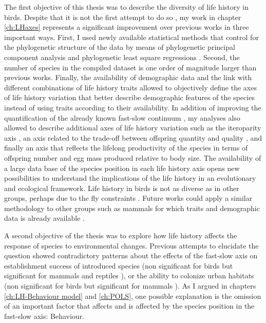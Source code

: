The first objective of this thesis was to describe the diversity of life
history in birds. Despite that it is not the first attempt to do so
\citep{Saether1987,Gaillard1989,Saether2000,Jeschke2009}, my work in chapter
\ref{ch:LHaxes} represents a significant improvement over previous works in
three important ways.
First, I used newly available statistical methods that control for the
phylogenetic structure of the data by means of phylogenetic principal component
analysis \citep{Revell2009a} and phylogenetic least square regressions
\citep{Ho2014}.
Second, the number of species in the compiled dataset is one order of magnitude
larger than previous works. Finally, the availability of demographic data and
the link with different combinations of life history traits allowed to
objectively define the axes of life history variation that better describe
demographic features of the species instead of using traits according to their
availability.
In addition of improving the quantification of the already known fast-slow
continuum
\citep{Stearns1983a,Saether1987,Gaillard1989,Oli2004,Dobson2007,Jeschke2009},
my analyses also allowed to describe additional axes of life history variation
such as the iteroparity axis \citep{Gaillard1989}, an axis related to the
trade-off between offspring quantity and quality
\citep{Promislow1990,Bielby2007,Dobson2007}, and finally an axis that reflects
the lifelong productivity of the species in terms of offspring number and egg
mass produced relative to body size.
The availability of a large data base of the species position in each life
history axis opens new possibilities to understand the implications of the life
history in an evolutionary and ecological framework.
Life history in birds is not as diverse as in other groups, perhaps due to the
fly constraints \citep{Gaillard1989,Healy2014}.
Future works could apply a similar methodology to other groups such as mammals
for which traits and demographic data is already available
\citep{Myhrvold2015,Salguero-Gomez2016}.

\bigskip

A second objective of the thesis was to explore how life history affects the
response of species to environmental changes. Previous attempts to elucidate
the question showed contradictory patterns about the effects of the fast-slow
axis on establishment success of introduced species (non significant for birds
\citep{Blackburn2009a,Sol2012a} but significant for mammals and reptiles
\citep{Capellini2015,Allen2017}), or the ability to colonize urban habitats
(non significant for birds \citep{Sol2014} but significant for mammals
\citep{Santini2019}).
As I argued in chapters \ref{ch:LH-Behaviour model} and \ref{ch:POLS}, one
possible explanation is the omission of an important factor that affects and
is affected by the species position in the fast-slow axis: Behaviour.


